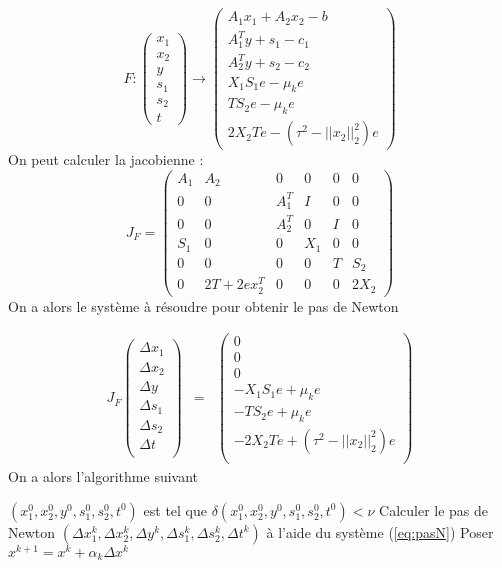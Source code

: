 $$
F : \begin{pmatrix}
x_1 \\ x_2 \\ y \\ s_1 \\ s_2 \\ t
\end{pmatrix}
\rightarrow
\begin{pmatrix}
A_1x_1+A_2x_2-b \\
A^T_1y + s_1 -c_1 \\
A_2^Ty + s_2 - c_2 \\
X_1S_1e - \mu_k e \\
TS_2e - \mu_ke \\
2X_2Te - (\tau^2-||x_2||_2^2)e
\end{pmatrix}
$$
On peut calculer la jacobienne : 
$$J_F = \begin{pmatrix}
A_1 & A_2 & 0 & 0 & 0 & 0 \\
0 & 0 & A_1^T & I & 0 & 0 \\
0 & 0 & A_2^T & 0 & I & 0 \\
S_1 & 0 & 0 & X_1 & 0 & 0 \\
0 & 0 & 0 & 0 & T & S_2 \\
0 & 2T + 2ex_2^T & 0 & 0 & 0 & 2X_2 

\end{pmatrix}$$
On a alors le système à résoudre pour obtenir le pas de Newton

\begin{align}
J_F \begin{pmatrix}
\Delta x_1 \\
\Delta x_2 \\
\Delta y \\
\Delta s_1\\
\Delta s_2\\
\Delta t\\
\end{pmatrix} & = & \begin{pmatrix}
0 \\
0\\
0\\
-X_1S_1e+\mu_k e \\
-TS_2e + \mu_k e\\
-2X_2Te+ (\tau^2-||x_2||_2^2)e\\
\end{pmatrix}
\label{eq:pasN}
\end{align}
On a alors l'algorithme suivant
\begin{algorithm}[!h]
$(x_1^{0},x_2^{0},y^{0},s_1^{0},s_2^{0},t^{0})$ est tel que 
$\delta(x_1^{0},x_2^{0},y^{0},s_1^{0},s_2^{0},t^{0}) < \nu$
Calculer le pas de Newton $(\Delta x_1^{k},\Delta x_2^{k},\Delta y^{k},\Delta s_1^{k},\Delta s_2^{k},\Delta t^{k})$ à l'aide du système (\ref{eq:pasN})\;
Poser $x^{k+1} = x^k + \alpha_k \Delta x^k$
\end{algorithm}